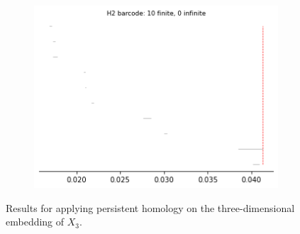 \begin{figure}[H]
\begin{subfigure}[b]{0.24\textwidth}
\includegraphics[width=\textwidth]{figures/topology/X3_H2_barcode.png}
 \caption{}
\end{subfigure}
\caption{Results for applying persistent homology on the three-dimensional embedding of $X_3$.}
\end{figure}

